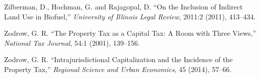 \documentclass[ecta,nameyear,draft]{econsocart}
\theoremstyle{plain}
\theoremstyle{remark}
\begin{document}
\begin{thebibliography}{}
\textup{Zilberman, D., Hochman, G. and Rajagopal, D.} %
``On the Inclusion of Indirect Land Use in Biofuel,''
\textit{University of Illinois Legal Review}, 2011:2 (2011), 413--434.


\textup{Zodrow, G. R.} %
``The Property Tax as a Capital Tax: A Room with Three Views,''
\textit{National Tax Journal}, 54:1 (2001), 139--156.
\endbibitem


\textup{Zodrow, G. R.} %
``Intrajurisdictional Capitalization and the Incidence of the Property Tax,''
\textit{Regional Science and Urban Economics}, 45 (2014), 57--66.
\endbibitem


%
%
%
%
%
\end{thebibliography}
\end{document}
